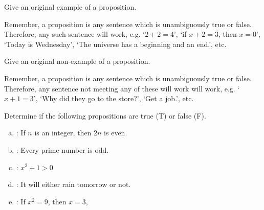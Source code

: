 \documentclass[11pt,letterpaper]{article}
\begin{document}
 Give an original example of a proposition.

\sol Remember, a proposition is any sentence which is unambiguously true or false. Therefore, any such sentence will work, e.g. `$2 + 2= 4$', `if $x + 2= 3$, then $x= 0$', `Today is Wednesday', `The universe has a beginning and an end.', etc. 



\newpage



 Give an original non-example of a proposition.

\sol Remember, a proposition is any sentence which is unambiguously true or false. Therefore, any sentence not meeting any of these will work will work, e.g. `$x + 1= 3$', `Why did they go to the store?', `Get a job.', etc. 



\newpage



 Determine if the following propositions are true (T) or false (F). 
	\begin{enumerate}[(a),topsep=0pt]
	\item {}: If $n$ is an integer, then $2n$ is even.
	\item {}: Every prime number is odd.
	\item {}: $x^2 + 1 > 0$
	\item {}: It will either rain tomorrow or not.
	\item {}: If $x^2= 9$, then $x= 3$,
	\end{enumerate}
\end{document}
